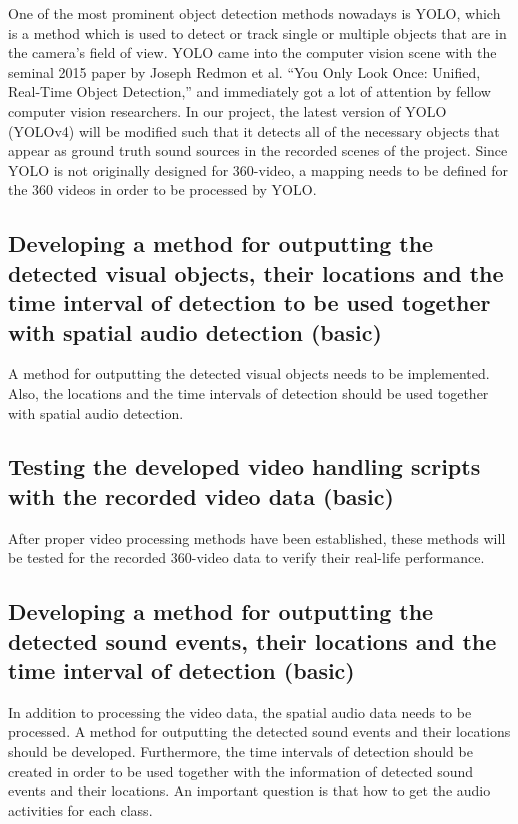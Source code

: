 One of the most prominent object detection methods nowadays is YOLO, which is a method which is used to detect or
track single or multiple objects that are in the camera's field of view. YOLO came into the computer vision scene
with the seminal 2015 paper by Joseph Redmon et al. “You Only Look Once: Unified, Real-Time Object Detection,”
and immediately got a lot of attention by fellow computer vision researchers. In our project, the latest version
of YOLO (YOLOv4) will be modified such that it detects all of the necessary objects that appear as ground truth
sound sources in the recorded scenes of the project. Since YOLO is not originally designed for 360-video, a
mapping needs to be defined for the 360 videos in order to be processed by YOLO.

\subsection{Developing a method for outputting the detected visual objects, their locations and the time interval of detection to be used together with spatial audio detection (basic)}

A method for outputting the detected visual objects needs to be implemented. Also, the locations and the time
intervals of detection should be used together with spatial audio detection.

\subsection{Testing the developed video handling scripts with the recorded video data (basic)}

After proper video processing methods have been established, these methods will be tested for the recorded 360-video data to verify their real-life performance.

\subsection{Developing a method for outputting the detected sound events, their locations and the time interval of detection (basic)}

In addition to processing the video data, the spatial audio data needs to be processed. A method for outputting
the detected sound events and their locations should be developed. Furthermore, the time intervals of detection
should be created in order to be used together with the information of detected sound events and their locations.
An important question is that how to get the audio activities for each class.

